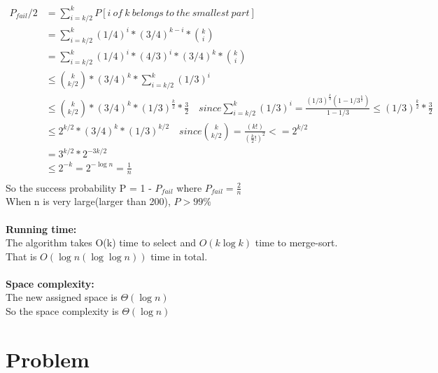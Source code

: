 \documentclass{article}
\begin{document}
\begin{equation}
\begin{aligned}
P_{fail}/2 &=\sum_{i=k/2}^k P[i\ of\ k\ belongs\ to\ the\ smallest\ part]\\
&=\sum_{i=k/2}^k(1/4)^i*(3/4)^{k-i}* {k \choose i}\\
&=\sum_{i=k/2}^k(1/4)^i*(4/3)^i*(3/4)^{k}* {k \choose i}\\
&\le {k \choose k/2}*(3/4)^k*\sum_{i=k/2}^k(1/3)^{i}\\
&\le{k \choose k/2}*(3/4)^k*(1/3)^{\frac{k}{2}}*\frac{3}{2} \quad since \sum_{i=k/2}^k(1/3)^{i} = \frac{(1/3)^{\frac{k}{2}}(1-1/3^{\frac{k}{2}})}{1-1/3}\le(1/3)^{\frac{k}{2}}*\frac{3}{2}\\
&\le 2^{k/2}*(3/4)^k*(1/3)^{k/2} \quad since {k \choose k/2}=\frac{(k!)}{(\frac{k}{2}!)^2}<=2^{k/2}\\
&=3^{k/2}*2^{-3k/2}\\
&\le 2^{-k} = 2^{-\log n}=\frac{1}{n}\\
\end{aligned}
\end{equation}
So the success probability P = 1 - $P_{fail}$ where $P_{fail} = \frac{2}{n}$\\
When n is very large(larger than 200), $P>99\%$\\\\
\textbf{\large Running time:}\\
The algorithm takes  O(k) time to select and $O(k\log k)$ time to merge-sort.\\
That is $O(\log n (\log{\log n}))$ time in total.\\\\
\noindent\textbf{\large Space complexity:}\\
The new assigned space is $\Theta(\log n)$\\
So the space complexity is $\Theta(\log n)$
\clearpage
\section{Problem \uppercase\expandafter{}} 
\end{document}
